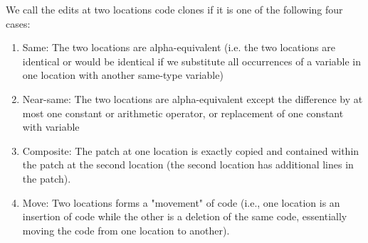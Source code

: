 \documentclass[10pt, conference]{IEEEtran}
\begin{document}

We call the edits at two locations code clones if it is one of the following four cases:
\begin{enumerate}
\item Same: The two locations are alpha-equivalent (i.e. the two locations are identical or would be
identical if we substitute all occurrences of a variable in one location with another same-type variable)
\item Near-same: The two locations are alpha-equivalent except the difference by at most one constant or arithmetic operator,
or replacement of one constant with variable
\item Composite: The patch at one location is exactly copied and contained within the patch at 
the 
second location (the second location  has additional lines in the patch).
\item Move: Two locations forms a "movement" of code (i.e., one location is an insertion of 
code 
while the other is a deletion of the same code, essentially moving the code from one location to 
another).
\end{enumerate}
\end{document}
